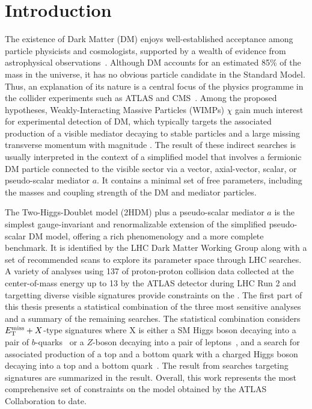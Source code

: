  \chapter{Introduction}

The existence of Dark Matter (DM) enjoys well-established acceptance among particle physicists and cosmologists, supported by a wealth of evidence from astrophysical observations~\cite{Corbelli:1999af,Rubin:1980,Begemann:1991,Hinshaw:2012aka,Akrami:2018vks,Trimble1987,Bertone2005,Feng2010}. 
Although DM accounts for an estimated 85\% of the mass in the universe, it has no obvious particle candidate in the Standard Model.
Thus, an explanation of its nature is a central focus of the physics programme in the collider experiments such as ATLAS and CMS~\cite{adan2023darkmattersearchescms}. 
Among the proposed hypotheses, Weakly-Interacting Massive Particles (WIMPs) $\chi$ gain much interest for experimental detection of DM, which typically targets the associated production of a visible mediator decaying to stable particles and a large missing transverse momentum with magnitude \met.
The result of these indirect searches is usually interpreted in the context of a simplified model that involves a fermionic DM particle connected to the visible sector via a vector, axial-vector, scalar, or pseudo-scalar mediator $a$. 
It contains a minimal set of free parameters, including the masses and coupling strength of the DM and mediator particles. 

The Two-Higgs-Doublet model (2HDM) plus a pseudo-scalar mediator $a$ is the simplest gauge-invariant and renormalizable extension of the simplified pseudo-scalar DM model, offering a rich phenomenology and a more complete benchmark.
It is identified by the LHC Dark Matter Working Group along with a set of recommended scans to explore its parameter space through LHC searches. 
A variety of analyses using 137 \ifb of proton-proton collision data collected at the center-of-mass energy up to 13 \TeV by the ATLAS detector during LHC Run 2 and targetting diverse visible signatures provide constraints on the \thdma. 
The first part of this thesis presents a statistical combination of the three most sensitive analyses and a summary of the remaining searches.
The statistical combination considers $E_{\mathrm{T}}^{\mathrm{miss}}+X$-type signatures where X is either a SM Higgs boson decaying into a pair of $b$-quarks~\cite{EXOT-2018-46} or a $Z$-boson decaying into a pair of leptons~\cite{HIGG-2018-26}, and a search for associated production of a top and a bottom quark with a charged Higgs boson decaying into a top and a bottom quark~\cite{HDBS-2018-51}.
The result from searches targeting signatures are summarized in the result. 
Overall, this work represents the most comprehensive set of constraints on the model obtained by the ATLAS Collaboration to date. 

